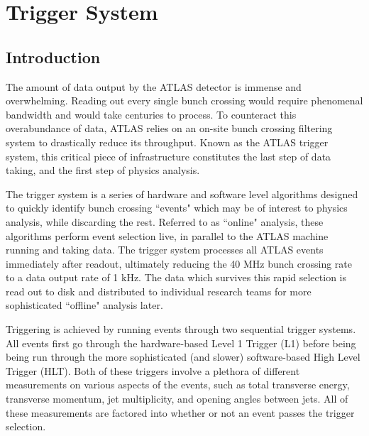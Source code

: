 \chapter{Trigger System}

\section{Introduction}
    The amount of data output by the ATLAS detector is immense and overwhelming.
    Reading out every single bunch crossing would require phenomenal bandwidth and would take centuries to process.
    To counteract this overabundance of data, ATLAS relies on an on-site bunch crossing filtering system to drastically reduce its throughput.
    Known as the ATLAS trigger system, this critical piece of infrastructure constitutes the last step of data taking, and the first step of physics analysis.

    The trigger system is a series of hardware and software level algorithms designed to quickly identify bunch crossing ``events" which may be of interest to physics analysis, while discarding the rest.
    Referred to as ``online" analysis, these algorithms perform event selection live, in parallel to the ATLAS machine running and taking data.
    The trigger system processes all ATLAS events immediately after readout, ultimately reducing the 40 MHz bunch crossing rate to a data output rate of 1 kHz.
    The data which survives this rapid selection is read out to disk and distributed to individual research teams for more sophisticated ``offline" analysis later.
    
    Triggering is achieved by running events through two sequential trigger systems.
    All events first go through the hardware-based Level 1 Trigger (L1) before being being run through the more sophisticated (and slower) software-based High Level Trigger (HLT).
    Both of these triggers involve a plethora of different measurements on various aspects of the events, such as total transverse energy, transverse momentum, jet multiplicity, and opening angles between jets.
    All of these measurements are factored into whether or not an event passes the trigger selection.

